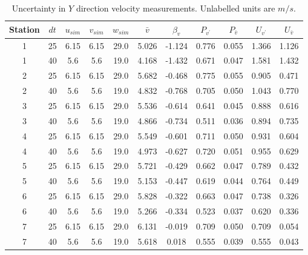 \renewcommand\baselinestretch{1.3}\selectfont
\begin{table}[H]
\begin{center}
\begin{tabular}{|ccccccccccc|}
	\hline
	Station & $dt$ & $u_{sim}$ & $v_{sim}$ & $w_{sim}$ & $\bar{v}$ & $\beta_v$ & $P_{v^{\prime}}$ & $P_{\bar{v}}$ & $U_{v^{\prime}}$ & $U_{\bar{v}}$\\
	\hline
	1 & 25 & 6.15 & 6.15 & 29.0 & 5.026 & -1.124 & 0.776 & 0.055 & 1.366 & 1.126\\
	1 & 40 & 5.6 & 5.6 & 19.0 & 4.168 & -1.432 & 0.671 & 0.047 & 1.581 & 1.432\\
	2 & 25 & 6.15 & 6.15 & 29.0 & 5.682 & -0.468 & 0.775 & 0.055 & 0.905 & 0.471\\
	2 & 40 & 5.6 & 5.6 & 19.0 & 4.832 & -0.768 & 0.705 & 0.050 & 1.043 & 0.770\\
	3 & 25 & 6.15 & 6.15 & 29.0 & 5.536 & -0.614 & 0.641 & 0.045 & 0.888 & 0.616\\
	3 & 40 & 5.6 & 5.6 & 19.0 & 4.866 & -0.734 & 0.511 & 0.036 & 0.894 & 0.735\\
	4 & 25 & 6.15 & 6.15 & 29.0 & 5.549 & -0.601 & 0.711 & 0.050 & 0.931 & 0.604\\
	4 & 40 & 5.6 & 5.6 & 19.0 & 4.973 & -0.627 & 0.720 & 0.051 & 0.955 & 0.629\\
	5 & 25 & 6.15 & 6.15 & 29.0 & 5.721 & -0.429 & 0.662 & 0.047 & 0.789 & 0.432\\
	5 & 40 & 5.6 & 5.6 & 19.0 & 5.153 & -0.447 & 0.619 & 0.044 & 0.764 & 0.449\\
	6 & 25 & 6.15 & 6.15 & 29.0 & 5.828 & -0.322 & 0.663 & 0.047 & 0.738 & 0.326\\
	6 & 40 & 5.6 & 5.6 & 19.0 & 5.266 & -0.334 & 0.523 & 0.037 & 0.620 & 0.336\\
	7 & 25 & 6.15 & 6.15 & 29.0 & 6.131 & -0.019 & 0.709 & 0.050 & 0.709 & 0.054\\
	7 & 40 & 5.6 & 5.6 & 19.0 & 5.618 & 0.018 & 0.555 & 0.039 & 0.555 & 0.043\\
	\hline
\end{tabular}
\caption{Uncertainty in $Y$ direction velocity measurements. Unlabelled units are $m/s$.}
\label{table:uncertainties_v}
\end{center}
\end{table}
\renewcommand\baselinestretch{2}\selectfont
